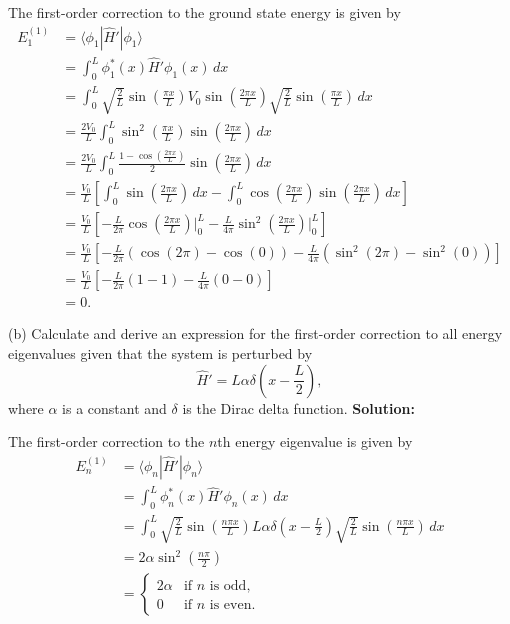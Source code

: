 \documentclass{article}
\begin{document}
The first-order correction to the ground state energy is given by
\begin{align*}
E_1^{(1)} &= \langle \phi_1 | \hat{H}' | \phi_1 \rangle \\
&= \int_0^L \phi_1^*(x) \hat{H}' \phi_1(x) \, dx \\
&= \int_0^L \sqrt{\frac{2}{L}} \sin\left(\frac{\pi x}{L}\right) V_0 \sin\left(\frac{2\pi x}{L}\right) \sqrt{\frac{2}{L}} \sin\left(\frac{\pi x}{L}\right) \, dx \\
&= \frac{2V_0}{L} \int_0^L \sin^2\left(\frac{\pi x}{L}\right) \sin\left(\frac{2\pi x}{L}\right) \, dx \\
&= \frac{2V_0}{L} \int_0^L \frac{1 - \cos\left(\frac{2\pi x}{L}\right)}{2} \sin\left(\frac{2\pi x}{L}\right) \, dx \\
&= \frac{V_0}{L} \left[ \int_0^L \sin\left(\frac{2\pi x}{L}\right) \, dx - \int_0^L \cos\left(\frac{2\pi x}{L}\right) \sin\left(\frac{2\pi x}{L}\right) \, dx \right] \\
&= \frac{V_0}{L} \left[ -\frac{L}{2\pi} \cos\left(\frac{2\pi x}{L}\right) \bigg|_0^L - \frac{L}{4\pi} \sin^2\left(\frac{2\pi x}{L}\right) \bigg|_0^L \right] \\
&= \frac{V_0}{L} \left[ -\frac{L}{2\pi} (\cos(2\pi) - \cos(0)) - \frac{L}{4\pi} (\sin^2(2\pi) - \sin^2(0)) \right] \\
&= \frac{V_0}{L} \left[ -\frac{L}{2\pi} (1 - 1) - \frac{L}{4\pi} (0 - 0) \right] \\
&= \boxed{0}.
\end{align*}

(b) Calculate and derive an expression for the first-order correction to all energy eigenvalues given that the system is perturbed by
\[
\hat{H}' = L \alpha \delta\left(x - \frac{L}{2}\right),
\]
where $\alpha$ is a constant and $\delta$ is the Dirac delta function.
\textbf{Solution:}

The first-order correction to the $n$th energy eigenvalue is given by
\begin{align*}
E_n^{(1)} &= \langle \phi_n | \hat{H}' | \phi_n \rangle \\
&= \int_0^L \phi_n^*(x) \hat{H}' \phi_n(x) \, dx \\
&= \int_0^L \sqrt{\frac{2}{L}} \sin\left(\frac{n \pi x}{L}\right) L \alpha \delta\left(x - \frac{L}{2}\right) \sqrt{\frac{2}{L}} \sin\left(\frac{n \pi x}{L}\right) \, dx \\
&= 2 \alpha \sin^2\left(\frac{n \pi}{2}\right) \\
&= \boxed{
\begin{cases}
2 \alpha & \text{if } n \text{ is odd}, \\
0 & \text{if } n \text{ is even}.
\end{cases}
}
\end{align*}
\end{document}
